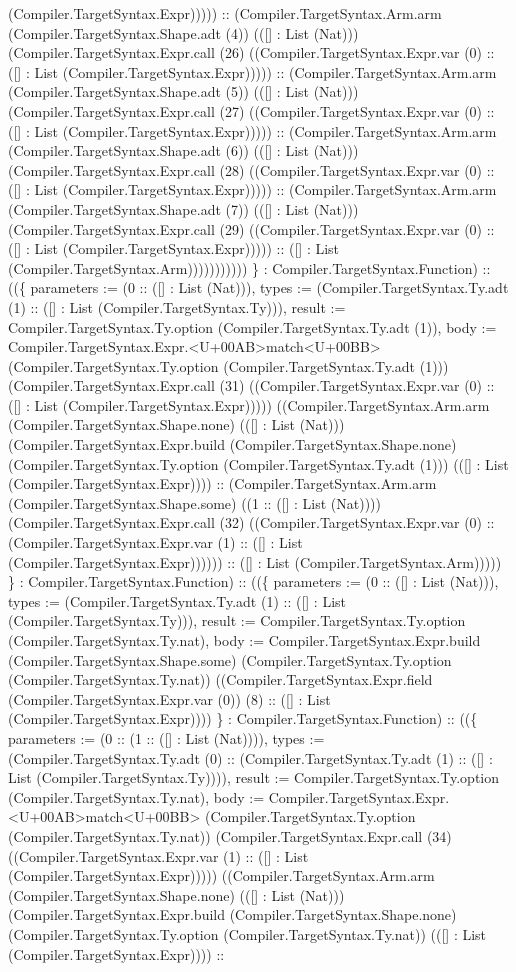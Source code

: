 \documentclass[11pt]{article}
\begin{document}
(Compiler.TargetSyntax.Expr))))) :: (Compiler.TargetSyntax.Arm.arm (Compiler.TargetSyntax.Shape.adt (4)) (([] : List (Nat))) (Compiler.TargetSyntax.Expr.call (26) ((Compiler.TargetSyntax.Expr.var (0) :: ([] : List (Compiler.TargetSyntax.Expr))))) :: (Compiler.TargetSyntax.Arm.arm (Compiler.TargetSyntax.Shape.adt (5)) (([] : List (Nat))) (Compiler.TargetSyntax.Expr.call (27) ((Compiler.TargetSyntax.Expr.var (0) :: ([] : List (Compiler.TargetSyntax.Expr))))) :: (Compiler.TargetSyntax.Arm.arm (Compiler.TargetSyntax.Shape.adt (6)) (([] : List (Nat))) (Compiler.TargetSyntax.Expr.call (28) ((Compiler.TargetSyntax.Expr.var (0) :: ([] : List (Compiler.TargetSyntax.Expr))))) :: (Compiler.TargetSyntax.Arm.arm (Compiler.TargetSyntax.Shape.adt (7)) (([] : List (Nat))) (Compiler.TargetSyntax.Expr.call (29) ((Compiler.TargetSyntax.Expr.var (0) :: ([] : List (Compiler.TargetSyntax.Expr))))) :: ([] : List (Compiler.TargetSyntax.Arm))))))))))) \} : Compiler.TargetSyntax.Function) :: ((\{ parameters := (0 :: ([] : List (Nat))), types := (Compiler.TargetSyntax.Ty.adt (1) :: ([] : List (Compiler.TargetSyntax.Ty))), result := Compiler.TargetSyntax.Ty.option (Compiler.TargetSyntax.Ty.adt (1)), body := Compiler.TargetSyntax.Expr.<U+00AB>match<U+00BB> (Compiler.TargetSyntax.Ty.option (Compiler.TargetSyntax.Ty.adt (1))) (Compiler.TargetSyntax.Expr.call (31) ((Compiler.TargetSyntax.Expr.var (0) :: ([] : List (Compiler.TargetSyntax.Expr))))) ((Compiler.TargetSyntax.Arm.arm (Compiler.TargetSyntax.Shape.none) (([] : List (Nat))) (Compiler.TargetSyntax.Expr.build (Compiler.TargetSyntax.Shape.none) (Compiler.TargetSyntax.Ty.option (Compiler.TargetSyntax.Ty.adt (1))) (([] : List (Compiler.TargetSyntax.Expr)))) :: (Compiler.TargetSyntax.Arm.arm (Compiler.TargetSyntax.Shape.some) ((1 :: ([] : List (Nat)))) (Compiler.TargetSyntax.Expr.call (32) ((Compiler.TargetSyntax.Expr.var (0) :: (Compiler.TargetSyntax.Expr.var (1) :: ([] : List (Compiler.TargetSyntax.Expr)))))) :: ([] : List (Compiler.TargetSyntax.Arm))))) \} : Compiler.TargetSyntax.Function) :: ((\{ parameters := (0 :: ([] : List (Nat))), types := (Compiler.TargetSyntax.Ty.adt (1) :: ([] : List (Compiler.TargetSyntax.Ty))), result := Compiler.TargetSyntax.Ty.option (Compiler.TargetSyntax.Ty.nat), body := Compiler.TargetSyntax.Expr.build (Compiler.TargetSyntax.Shape.some) (Compiler.TargetSyntax.Ty.option (Compiler.TargetSyntax.Ty.nat)) ((Compiler.TargetSyntax.Expr.field (Compiler.TargetSyntax.Expr.var (0)) (8) :: ([] : List (Compiler.TargetSyntax.Expr)))) \} : Compiler.TargetSyntax.Function) :: ((\{ parameters := (0 :: (1 :: ([] : List (Nat)))), types := (Compiler.TargetSyntax.Ty.adt (0) :: (Compiler.TargetSyntax.Ty.adt (1) :: ([] : List (Compiler.TargetSyntax.Ty)))), result := Compiler.TargetSyntax.Ty.option (Compiler.TargetSyntax.Ty.nat), body := Compiler.TargetSyntax.Expr.<U+00AB>match<U+00BB> (Compiler.TargetSyntax.Ty.option (Compiler.TargetSyntax.Ty.nat)) (Compiler.TargetSyntax.Expr.call (34) ((Compiler.TargetSyntax.Expr.var (1) :: ([] : List (Compiler.TargetSyntax.Expr))))) ((Compiler.TargetSyntax.Arm.arm (Compiler.TargetSyntax.Shape.none) (([] : List (Nat))) (Compiler.TargetSyntax.Expr.build (Compiler.TargetSyntax.Shape.none) (Compiler.TargetSyntax.Ty.option (Compiler.TargetSyntax.Ty.nat)) (([] : List (Compiler.TargetSyntax.Expr)))) :: 
\end{document}
